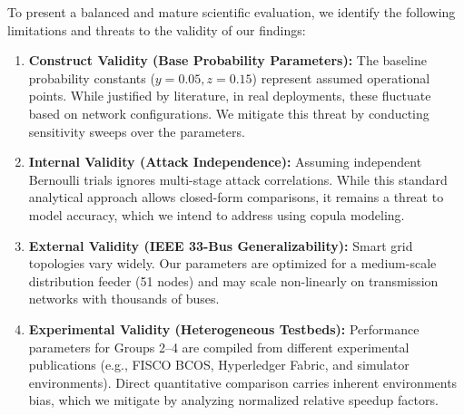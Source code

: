 \documentclass[10pt,twocolumn,journal]{IEEEtran}
\begin{document}
To present a balanced and mature scientific evaluation, we identify the following limitations and threats to the validity of our findings:
\begin{enumerate}[leftmargin=*]
    \item \textbf{Construct Validity (Base Probability Parameters):} The baseline probability constants ($y=0.05, z=0.15$) represent assumed operational points. While justified by literature, in real deployments, these fluctuate based on network configurations. We mitigate this threat by conducting sensitivity sweeps over the parameters.
    \item \textbf{Internal Validity (Attack Independence):} Assuming independent Bernoulli trials ignores multi-stage attack correlations. While this standard analytical approach allows closed-form comparisons, it remains a threat to model accuracy, which we intend to address using copula modeling.
    \item \textbf{External Validity (IEEE 33-Bus Generalizability):} Smart grid topologies vary widely. Our parameters are optimized for a medium-scale distribution feeder (51 nodes) and may scale non-linearly on transmission networks with thousands of buses.
    \item \textbf{Experimental Validity (Heterogeneous Testbeds):} Performance parameters for Groups 2--4 are compiled from different experimental publications (e.g., FISCO BCOS, Hyperledger Fabric, and simulator environments). Direct quantitative comparison carries inherent environments bias, which we mitigate by analyzing normalized relative speedup factors.
\end{enumerate}

\end{document}
